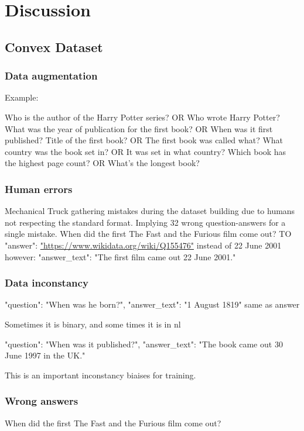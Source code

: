\chapter{Discussion}
\label{chap:discussion}


\section{Convex Dataset}
\subsection{Data augmentation}
Example:

Who is the author of the Harry Potter series? OR Who wrote Harry Potter?
What was the year of publication for the first book? OR When was it first published?
Title of the first book? OR The first book was called what?
What country was the book set in? OR It was set in what country?
Which book has the highest page count? OR What's the longest book?


\subsection{Human errors}
Mechanical Truck gathering mistakes during the dataset building due to humans not respecting the standard format. Implying 32 wrong question-answers for a single mistake.
When did the first The Fast and the Furious film come out?
TO "answer": \url{"https://www.wikidata.org/wiki/Q155476"} instead of 22 June 2001
however: "answer\_text": "The first film came out 22 June 2001."

\subsection{Data inconstancy}
"question": "When was he born?",
"answer\_text": "1 August 1819" same as answer

Sometimes it is binary, and some times it is in \gls{nl}

"question": "When was it published?", 
"answer\_text": "The book came out 30 June 1997 in the UK."

This is an important inconstancy biaises for training.

\subsection{Wrong answers}
When did the first The Fast and the Furious film come out?

